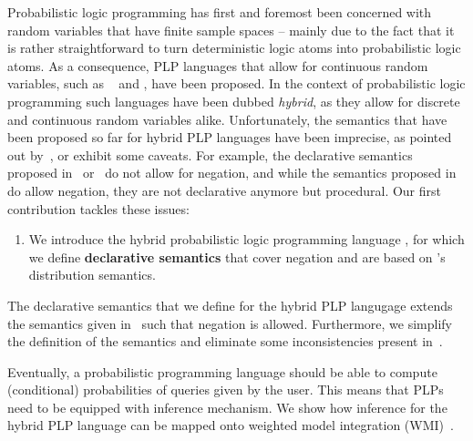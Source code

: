 Probabilistic logic programming has first and foremost been concerned with random variables that have finite sample spaces -- mainly due to the fact that it is rather straightforward to turn deterministic logic atoms into probabilistic logic atoms.
As a consequence, PLP languages that allow for continuous random variables, such as \extendedprismsty~\citep{islam2012inference} and \dcsty{}, have been proposed.
In the context of probabilistic logic programming such languages have been dubbed {\em hybrid}, as they allow for discrete and continuous random variables alike.
Unfortunately, the semantics that have been proposed so far for hybrid PLP languages have been imprecise, as pointed out by~\citet{azzolini2021semantics}, or exhibit some caveats. For example, the declarative semantics proposed in~\citep{islam2012inference} or~\citep{gutmann2011magic} do not allow for negation, and while the semantics proposed in~\citep{nitti2016probabilistic}  do allow negation, they are not declarative anymore but procedural. Our first contribution tackles these issues:
\begin{enumerate}
    \item We introduce the hybrid probabilistic logic programming language \dcproblogsty, for which we define {\bf declarative semantics} that cover negation and are based on \citeauthor{sato1995statistical}'s distribution semantics.
\end{enumerate}
The declarative semantics that we define for the hybrid PLP langugage \dcproblogsty extends the semantics given in~\citep{gutmann2011magic} such that negation is allowed. Furthermore, we simplify the definition of the semantics and eliminate some inconsistencies present in~\citep{gutmann2011magic}.

Eventually, a probabilistic programming language should be able to compute (conditional) probabilities of queries given by the user. This means that PLPs need to be equipped with inference mechanism. We show how inference for the hybrid PLP language \dcproblogsty can be mapped onto weighted model integration (WMI)~\citep{belle2015probabilistic}. 


